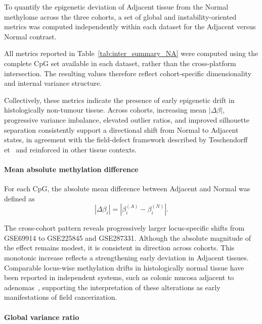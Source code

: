 To quantify the epigenetic deviation of Adjacent tissue from the Normal methylome across the three cohorts, a set of global and instability-oriented metrics was computed independently within each dataset for the Adjacent versus Normal contrast.

All metrics reported in Table~\ref{tab:inter_summary_NA} were computed using the complete CpG set available in each dataset, rather than the cross-platform intersection. The resulting values therefore reflect cohort-specific dimensionality and internal variance structure.

Collectively, these metrics indicate the presence of early epigenetic drift in histologically non-tumour tissue. Across cohorts, increasing mean $|\Delta\beta|$, progressive variance imbalance, elevated outlier ratios, and improved silhouette separation consistently support a directional shift from Normal to Adjacent states, in agreement with the field-defect framework described by Teschendorff et~\cite{teschendorff2016} and reinforced in other tissue contexts.

\paragraph{Mean absolute methylation difference}  

For each CpG, the absolute mean difference between Adjacent and Normal was defined as
\begin{equation}
|\Delta\beta_i| = \left| \beta^{(A)}_i - \beta^{(N)}_i \right|.
\label{eq:mean_abs_delta_beta}
\end{equation}

The cross-cohort pattern reveals progressively larger locus-specific shifts from GSE69914 to GSE225845 and GSE287331.  
Although the absolute magnitude of the effect remains modest, it is consistent in direction across cohorts.  
This monotonic increase reflects a strengthening early deviation in Adjacent tissues. Comparable locus-wise methylation drifts in histologically normal tissue have been reported in independent systems, such as colonic mucosa adjacent to adenomas~\cite{Yates2024_NormalMucosaField}, supporting the interpretation of these alterations as early manifestations of field cancerization.

\paragraph{Global variance ratio}  

